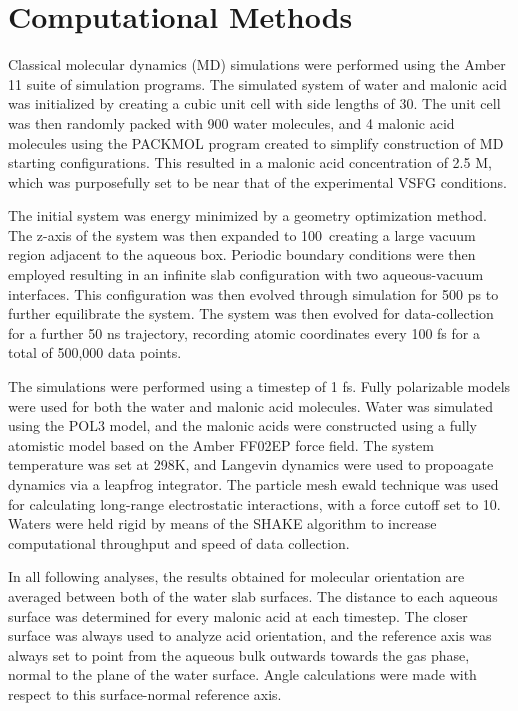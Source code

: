 \section {Computational Methods}

Classical molecular dynamics (MD) simulations were performed using the Amber 11 suite of simulation programs.\cite{XXX} The simulated system of water and malonic acid was initialized by creating a cubic unit cell with side lengths of 30\angs. The unit cell was then randomly packed with 900 water molecules, and 4 malonic acid molecules using the PACKMOL program created to simplify construction of MD starting configurations.\cite{Packmol} This resulted in a malonic acid concentration of 2.5 M, which was purposefully set to be near that of the experimental VSFG conditions.

The initial system was energy minimized by a geometry optimization method. The z-axis of the system was then expanded to 100\angs~creating a large vacuum region adjacent to the aqueous box. Periodic boundary conditions were then employed resulting in an infinite slab configuration\cite{XX} with two aqueous-vacuum interfaces. This configuration was then evolved through simulation for 500 ps to further equilibrate the system. The system was then evolved for data-collection for a further 50 ns trajectory, recording atomic coordinates every 100 fs for a total of 500,000 data points.

The simulations were performed using a timestep of 1 fs. Fully polarizable models were used for both the water and malonic acid molecules. Water was simulated using the POL3 model,\cite{XX} and the malonic acids were constructed using a fully atomistic model based on the Amber FF02EP force field. The system temperature was set at 298K, and Langevin dynamics were used to propoagate dynamics via a leapfrog integrator. The particle mesh ewald technique was used for calculating long-range electrostatic interactions, with a force cutoff set to 10\angs. Waters were held rigid by means of the SHAKE algorithm to increase computational throughput and speed of data collection.

In all following analyses, the results obtained for molecular orientation are averaged between both of the water slab surfaces. The distance to each aqueous surface was determined for every malonic acid at each timestep. The closer surface was always used to analyze acid orientation, and the reference axis was always set to point from the aqueous bulk outwards towards the gas phase, normal to the plane of the water surface. Angle calculations were made with respect to this surface-normal reference axis.
